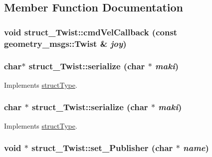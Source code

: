 \subsection{Member Function Documentation}
\hypertarget{classstruct__Twist_aa4b5acddd72e4b9766989bd9be5e2285}{
\subsubsection[{cmdVelCallback}]{\setlength{\rightskip}{0pt plus 5cm}void struct\_\-Twist::cmdVelCallback (const geometry\_\-msgs::Twist \& {\em joy})}}
\label{classstruct__Twist_aa4b5acddd72e4b9766989bd9be5e2285}
\hypertarget{classstruct__Twist_afc5c6e9e092a700e3906e67d7918d4ab}{
\subsubsection[{serialize}]{\setlength{\rightskip}{0pt plus 5cm}char$\ast$ struct\_\-Twist::serialize (char $\ast$ {\em maki})}}
\label{classstruct__Twist_afc5c6e9e092a700e3906e67d7918d4ab}


Implements \hyperlink{classstructType_a515f5e08e2c7c054145d5dcce4e8adb1}{structType}.

\hypertarget{classstruct__Twist_aee6e94e0914c89920f211a04b5ad4f9f}{
\subsubsection[{serialize}]{\setlength{\rightskip}{0pt plus 5cm}char $\ast$ struct\_\-Twist::serialize (char $\ast$ {\em maki})}}
\label{classstruct__Twist_aee6e94e0914c89920f211a04b5ad4f9f}


Implements \hyperlink{classstructType_a515f5e08e2c7c054145d5dcce4e8adb1}{structType}.

\hypertarget{classstruct__Twist_adb9080f278fb0608806c42156f1f9d69}{
\subsubsection[{set\_\-Publisher}]{\setlength{\rightskip}{0pt plus 5cm}void $\ast$ struct\_\-Twist::set\_\-Publisher (char $\ast$ {\em name})}}
\label{classstruct__Twist_adb9080f278fb0608806c42156f1f9d69}


